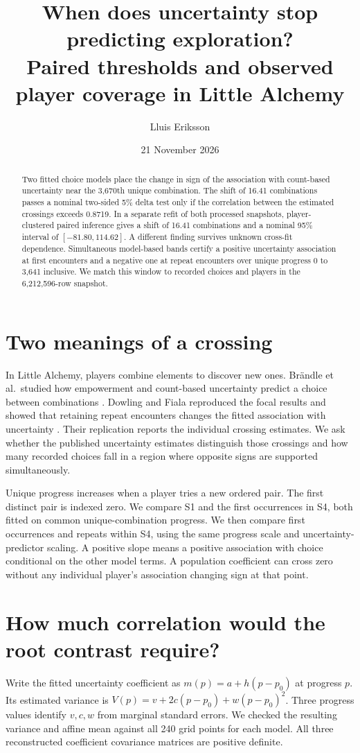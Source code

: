 \documentclass[11pt]{article}
\title{When does uncertainty stop predicting exploration?\\Paired thresholds and observed player coverage in Little Alchemy}
\author{Lluis Eriksson}\date{21 November 2026}
\begin{document}
\maketitle
\begin{abstract}
Two fitted choice models place the change in sign of the association with count-based uncertainty near the 3,670th unique combination. The shift of 16.41 combinations passes a nominal two-sided 5\% delta test only if the correlation between the estimated crossings exceeds 0.8719. In a separate refit of both processed snapshots, player-clustered paired inference gives a shift of 16.41 combinations and a nominal 95\% interval of $[-81.80,114.62]$. A different finding survives unknown cross-fit dependence. Simultaneous model-based bands certify a positive uncertainty association at first encounters and a negative one at repeat encounters over unique progress 0 to 3,641 inclusive. We match this window to recorded choices and players in the 6,212,596-row snapshot.
\end{abstract}
\section{Two meanings of a crossing}
In Little Alchemy, players combine elements to discover new ones. Br\"andle et al.\ studied how empowerment and count-based uncertainty predict a choice between combinations \cite{orig}. Dowling and Fiala reproduced the focal results and showed that retaining repeat encounters changes the fitted association with uncertainty \cite{rep}. Their replication reports the individual crossing estimates. We ask whether the published uncertainty estimates distinguish those crossings and how many recorded choices fall in a region where opposite signs are supported simultaneously.

Unique progress increases when a player tries a new ordered pair. The first distinct pair is indexed zero. We compare S1 and the first occurrences in S4, both fitted on common unique-combination progress. We then compare first occurrences and repeats within S4, using the same progress scale and uncertainty-predictor scaling. A positive slope means a positive association with choice conditional on the other model terms. A population coefficient can cross zero without any individual player's association changing sign at that point.
\newpage
\section{How much correlation would the root contrast require?}
Write the fitted uncertainty coefficient as $m(p)=a+h(p-p_0)$ at progress $p$. Its estimated variance is $V(p)=v+2c(p-p_0)+w(p-p_0)^2$. Three progress values identify $v,c,w$ from marginal standard errors. We checked the resulting variance and affine mean against all 240 grid points for each model. All three reconstructed coefficient covariance matrices are positive definite.
\end{document}
